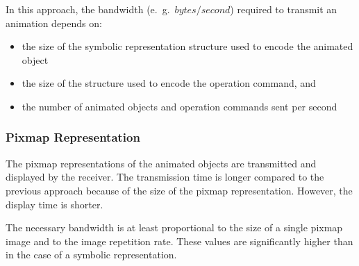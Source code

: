 In this approach, the bandwidth (e.\ g.\ $ bytes/second $) required to transmit an animation depends on:
\begin{itemize}
	\item the size of the symbolic representation structure used to encode the animated object
	\item the size of the structure used to encode the operation command, and 	
	\item the number of animated objects and operation commands sent per second
\end{itemize}


\subsubsection{Pixmap Representation}
The pixmap representations of the animated objects are transmitted and displayed by the receiver. The transmission time is longer compared to the previous approach because of the size of the pixmap representation. However, the display time is shorter.

The necessary bandwidth is at least proportional to the size of a single pixmap	image and to the image repetition rate. These values are significantly higher than in the case of a symbolic representation.

\newpage\thispagestyle{empty}

